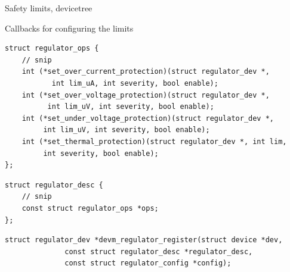 \documentclass[10pt]{beamer}
\begin{document}

\begin{frame}[t]{Safety limits, devicetree}\vspace{4pt}

\end{frame}


\begin{frame}[fragile]{Callbacks for configuring the limits}
\lstset{language=C}
\scriptsize

\begin{lstlisting}
struct regulator_ops {
	// snip
	int (*set_over_current_protection)(struct regulator_dev *,
	       int lim_uA, int severity, bool enable);
	int (*set_over_voltage_protection)(struct regulator_dev *,
	      int lim_uV, int severity, bool enable);
	int (*set_under_voltage_protection)(struct regulator_dev *,
	     int lim_uV, int severity, bool enable);
	int (*set_thermal_protection)(struct regulator_dev *, int lim,
	     int severity, bool enable);
};
\end{lstlisting}
\pause

\begin{lstlisting}
struct regulator_desc {
	// snip
	const struct regulator_ops *ops;
};
 \end{lstlisting}
\pause

\begin{lstlisting}
struct regulator_dev *devm_regulator_register(struct device *dev,
			  const struct regulator_desc *regulator_desc,
			  const struct regulator_config *config);
\end{lstlisting}

\end{frame}
\end{document}

